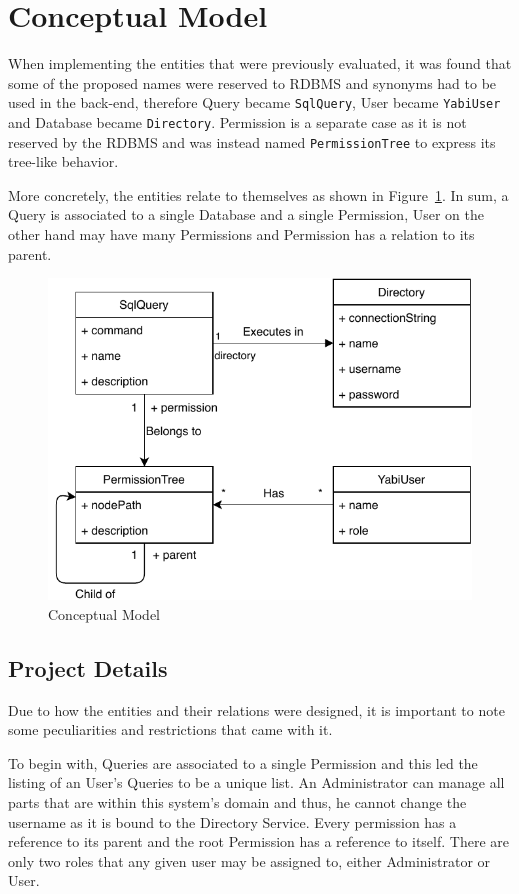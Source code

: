 \section{Conceptual Model}\label{tities}
When implementing the entities that were previously evaluated, it was found that some of the proposed names were reserved to \gls{RDBMS} and synonyms had to be used in the back-end, therefore Query became \texttt{SqlQuery}, User became \texttt{YabiUser} and Database became \texttt{Directory}. Permission is a separate case as it is not reserved by the \gls{RDBMS} and was instead named \texttt{PermissionTree} to express its tree-like behavior.

More concretely, the entities relate to themselves as shown in Figure~\ref{fig:er}. In sum, a Query is associated to a single Database and a single Permission, User on the other hand may have many Permissions and Permission has a relation to its parent.

\begin{figure}
  \centering
  \includegraphics[width=.65\textwidth]{images/diagramas/er}
  \caption{Conceptual Model}\label{fig:er}
\end{figure}

\subsection{Project Details}\label{p:details}
Due to how the entities and their relations were designed, it is important to note some peculiarities and restrictions that came with it.

To begin with, Queries are associated to a single Permission and this led the listing of an User's Queries to be a unique list. An Administrator can manage all parts that are within this system's domain and thus, he cannot change the username as it is bound to the Directory Service. Every permission has a reference to its parent and the root Permission has a reference to itself. There are only two roles that any given user may be assigned to, either Administrator or User.

